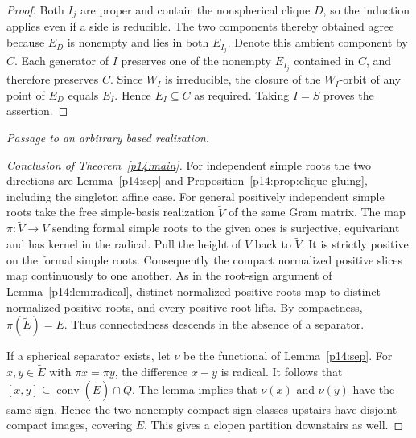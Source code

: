 \documentclass[11pt,reqno]{amsart}
\theoremstyle{plain}
\theoremstyle{definition}
\theoremstyle{remark}
\numberwithin{equation}{section}
\begin{document}
\begin{proof}
Both $I_j$ are proper and contain the nonspherical clique $D$,
so the induction applies even if a side is reducible. The two
components thereby obtained agree because $E_D$ is nonempty and
lies in both $E_{I_j}$. Denote this ambient component by $C$.
Each generator of $I$ preserves one of the nonempty $E_{I_j}$
contained in $C$, and therefore preserves $C$. Since $W_I$ is
irreducible, the closure of the $W_I$-orbit of any point of
$E_D$ equals $E_I$. Hence $E_I\subseteq C$ as required.
Taking $I=S$ proves the assertion.
\end{proof}

\par\medskip
\noindent\emph{Passage to an arbitrary based realization.}
\begin{proof}[Conclusion of Theorem~\ref{p14:main}]
For independent simple roots the two directions are Lemma~\ref{p14:sep} and Proposition~\ref{p14:prop:clique-gluing}, including the singleton affine case. For general positively independent simple roots take the free simple-basis realization $\widetilde V$ of the same Gram matrix. The map $\pi:\widetilde V\to V$ sending formal simple roots to the given ones is surjective, equivariant and has kernel in the radical. Pull the height of $V$ back to $\widetilde V$. It is strictly positive on the formal simple roots. Consequently the compact normalized positive slices map continuously to one another. As in the root-sign argument of Lemma~\ref{p14:lem:radical}, distinct normalized positive roots map to distinct normalized positive roots, and every positive root lifts. By compactness, $\pi(\widetilde E)=E$. Thus connectedness descends in the absence of a separator.

If a spherical separator exists, let $\nu$ be the functional of Lemma~\ref{p14:sep}. For $x,y\in\widetilde E$ with $\pi x=\pi y$, the difference $x-y$ is radical. It follows that $[x,y]\subseteq\operatorname{conv}(\widetilde E)\cap\widetilde Q$. The lemma implies that $\nu(x)$ and $\nu(y)$ have the same sign. Hence the two nonempty compact sign classes upstairs have disjoint compact images, covering $E$. This gives a clopen partition downstairs as well.
\end{proof}
\end{document}
